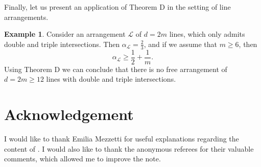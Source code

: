 \documentclass[12pt]{article}
\theoremstyle{plain}
\theoremstyle{definition}
\newtheorem{example}[thm]{Example}
\begin{document}
Finally, let us present an application of Theorem D in the setting of line arrangements.
\begin{example}
Consider an arrangement $\mathcal{L}$ of $d=2m$ lines, which only admits double and triple intersections. Then $\alpha_{\mathcal{L}} = \frac{2}{3}$, and if we assume that $m\geq 6$, then
$$\alpha_{\mathcal{L}} \geq \frac{1}{2} + \frac{1}{m}.$$
Using Theorem D we can conclude that there is no free arrangement of $d=2m\geq 12$ lines with double and triple intersections.
\end{example}

\section*{Acknowledgement}
I would like to thank Emilia Mezzetti for useful explanations regarding the content of \cite{GM}. I would also like to thank the anonymous referees for their valuable comments, which allowed me to improve the note.
\end{document}
